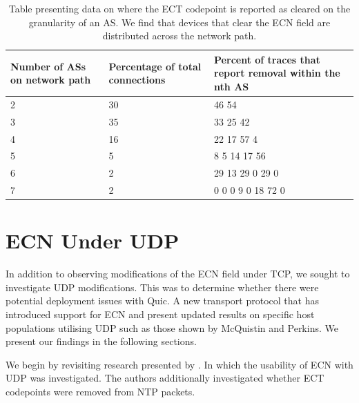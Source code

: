 \documentclass{l4proj}
\begin{document}
\begin{table}[H]
\centering
\begin{tabular}{|p{4cm}|p{4cm}|p{4cm}|}
\hline
Number of ASs on network path & Percentage of total \newline connections & Percent of traces that report  removal within the nth AS \\ \hline
2                             & 30                              & 46 54                                                   \\ \hline
3                             & 35                              & 33 25 42                                                \\ \hline
4                             & 16                              & 22 17 57 4                                             \\ \hline
5                             & 5                               & 8 5 14 17 56                                            \\ \hline
6                             & 2                               & 29 13 29 0 29 0                                         \\ \hline
7                             & 2                               & 0 0 0 9 0 18 72 0                                       \\ \hline
\end{tabular}
\caption{Table presenting data on where the ECT codepoint is reported as cleared on the granularity of an AS. We find that devices that clear the ECN field are distributed across the network path.}
\label{tab:asdata}
\end{table}




\section{ECN Under UDP}

In addition to observing modifications of the ECN field under TCP, we sought to investigate UDP modifications. This was to determine whether there were potential deployment issues with Quic. A new transport protocol that has introduced support for ECN and present updated results on specific host populations utilising UDP such as those shown by McQuistin and Perkins\cite{mcquistin_is_2015}. We present our findings in the following sections.

We begin by revisiting research presented by \cite{mcquistin_is_2015}. In which the usability of ECN with UDP was investigated. The authors additionally investigated whether ECT codepoints were removed from NTP packets.
\end{document}
